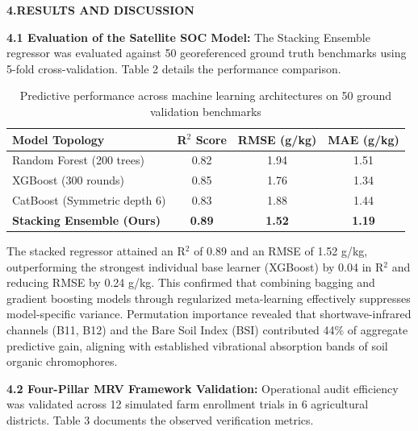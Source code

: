\documentclass[11pt,a4paper]{article}
\begin{document}
\noindent \textbf{\large 4.RESULTS AND DISCUSSION}
\vspace{0.5em}

\noindent \textbf{4.1 Evaluation of the Satellite SOC Model:} 
The Stacking Ensemble regressor was evaluated against 50 georeferenced ground truth benchmarks using 5-fold cross-validation. Table 2 details the performance comparison.

\begin{table}[H]
\caption{Predictive performance across machine learning architectures on 50 ground validation benchmarks}
\centering
\begin{tabular}{l c c c}
\toprule
\textbf{Model Topology} & \textbf{R$^2$ Score} & \textbf{RMSE (g/kg)} & \textbf{MAE (g/kg)} \\
\midrule
Random Forest (200 trees) & 0.82 & 1.94 & 1.51 \\
XGBoost (300 rounds) & 0.85 & 1.76 & 1.34 \\
CatBoost (Symmetric depth 6) & 0.83 & 1.88 & 1.44 \\
\textbf{Stacking Ensemble (Ours)} & \textbf{0.89} & \textbf{1.52} & \textbf{1.19} \\
\bottomrule
\end{tabular}
\end{table}

The stacked regressor attained an R$^2$ of 0.89 and an RMSE of 1.52 g/kg, outperforming the strongest individual base learner (XGBoost) by 0.04 in R$^2$ and reducing RMSE by 0.24 g/kg. This confirmed that combining bagging and gradient boosting models through regularized meta-learning effectively suppresses model-specific variance. Permutation importance revealed that shortwave-infrared channels (B11, B12) and the Bare Soil Index (BSI) contributed 44\% of aggregate predictive gain, aligning with established vibrational absorption bands of soil organic chromophores.

\noindent \textbf{4.2 Four-Pillar MRV Framework Validation:} 
Operational audit efficiency was validated across 12 simulated farm enrollment trials in 6 agricultural districts. Table 3 documents the observed verification metrics.
\end{document}
